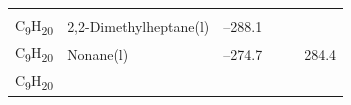 \documentclass[
  9pt,
]{extbook}
\theoremstyle{definition}
\theoremstyle{definition}
\theoremstyle{definition}
\theoremstyle{remark}
\begin{document}
\begin{longtable}[]{@{}llllll@{}}
\begin{minipage}[t]{0.15\columnwidth}
\strut
\end{minipage} & \begin{minipage}[t]{0.14\columnwidth}\raggedright
\strut
\end{minipage} & \begin{minipage}[t]{0.14\columnwidth}\raggedright
\strut
\end{minipage}\tabularnewline
\begin{minipage}[t]{0.07\columnwidth}\raggedright
C\textsubscript{9}H\textsubscript{20}\strut
\end{minipage} & \begin{minipage}[t]{0.17\columnwidth}\raggedright
2,2-Dimethylheptane(l)\strut
\end{minipage} & \begin{minipage}[t]{0.15\columnwidth}\raggedright
--288.1\strut
\end{minipage} & \begin{minipage}[t]{0.15\columnwidth}\raggedright
\strut
\end{minipage} & \begin{minipage}[t]{0.14\columnwidth}\raggedright
\strut
\end{minipage} & \begin{minipage}[t]{0.14\columnwidth}\raggedright
\strut
\end{minipage}\tabularnewline
\begin{minipage}[t]{0.07\columnwidth}\raggedright
C\textsubscript{9}H\textsubscript{20}\strut
\end{minipage} & \begin{minipage}[t]{0.17\columnwidth}\raggedright
Nonane(l)\strut
\end{minipage} & \begin{minipage}[t]{0.15\columnwidth}\raggedright
--274.7\strut
\end{minipage} & \begin{minipage}[t]{0.15\columnwidth}\raggedright
\strut
\end{minipage} & \begin{minipage}[t]{0.14\columnwidth}\raggedright
\strut
\end{minipage} & \begin{minipage}[t]{0.14\columnwidth}\raggedright
284.4\strut
\end{minipage}\tabularnewline
\begin{minipage}[t]{0.07\columnwidth}\raggedright
C\textsubscript{9}H\textsubscript{20}\strut
\end{minipage} & \begin{minipage}[t]{0.17\columnwidth}\raggedright

\end{minipage}
\end{longtable}
\end{document}
